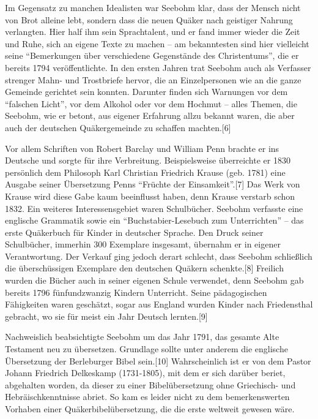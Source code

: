 \medskip

Im Gegensatz zu manchen Idealisten war Seebohm klar, dass der Mensch nicht von
Brot alleine lebt, sondern dass die neuen Quäker nach geistiger Nahrung
verlangten. Hier half ihm sein Sprachtalent, und er fand immer wieder die Zeit
und Ruhe, sich an eigene Texte zu machen – am bekanntesten sind hier vielleicht
seine "`Bemerkungen über verschiedene Gegenstände des Christentums"', die er
bereits 1794 veröffentlichte. In den ersten Jahren trat Seebohm auch als
Verfasser strenger Mahn- und Trostbriefe hervor, die an Einzelpersonen wie an
die ganze Gemeinde gerichtet sein konnten. Darunter finden sich Warnungen vor
dem "`falschen Licht"', vor dem Alkohol oder vor dem Hochmut – alles Themen, die
Seebohm, wie er betont, aus eigener Erfahrung allzu bekannt waren, die aber auch
der deutschen Quäkergemeinde zu schaffen machten.[6]

\medskip

Vor allem Schriften von Robert Barclay und William Penn brachte er ins Deutsche
und sorgte für ihre Verbreitung. Beispielsweise überreichte er 1830 persönlich
dem Philosoph Karl Christian Friedrich Krause (geb. 1781) eine Ausgabe seiner
Übersetzung Penns "`Früchte der Einsamkeit"'.[7] Das Werk von Krause wird diese
Gabe kaum beeinflusst haben, denn Krause verstarb schon 1832. Ein weiteres
Interessensgebiet waren Schulbücher. Seebohm verfasste eine englische Grammatik
sowie ein "`Buchstabier-Lesebuch zum Unterrichten"' – das erste Quäkerbuch für
Kinder in deutscher Sprache. Den Druck seiner Schulbücher, immerhin 300
Exemplare insgesamt, übernahm er in eigener Verantwortung. Der Verkauf ging
jedoch derart schlecht, dass Seebohm schließlich die überschüssigen Exemplare
den deutschen Quäkern schenkte.[8] Freilich wurden die Bücher auch in seiner
eigenen Schule verwendet, denn Seebohm gab bereits 1796 fünfundzwanzig Kindern
Unterricht. Seine pädagogischen Fähigkeiten waren geschätzt, sogar aus England
wurden Kinder nach Friedensthal gebracht, wo sie für meist ein Jahr Deutsch
lernten.[9]

\medskip

Nachweislich beabsichtigte Seebohm um das Jahr 1791, das gesamte Alte Testament
neu zu übersetzen. Grundlage sollte unter anderem die englische Übersetzung der
Berleburger Bibel sein.[10] Wahrscheinlich ist er von dem Pastor Johann
Friedrich Delkeskamp (1731-1805), mit dem er sich darüber beriet, abgehalten
worden, da dieser zu einer Bibelübersetzung ohne Griechisch- und
Hebräischkenntnisse abriet. So kam es leider nicht zu dem bemerkenswerten
Vorhaben einer Quäkerbibelübersetzung, die die erste weltweit gewesen wäre.

